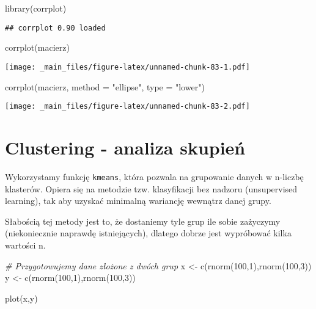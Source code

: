 \documentclass[
]{book}
\newenvironment{Shaded}{\begin{snugshade}}{\end{snugshade}}
\newcommand{\AttributeTok}[1]{\textcolor[rgb]{0.77,0.63,0.00}{#1}}
\newcommand{\CommentTok}[1]{\textcolor[rgb]{0.56,0.35,0.01}{\textit{#1}}}
\newcommand{\DecValTok}[1]{\textcolor[rgb]{0.00,0.00,0.81}{#1}}
\newcommand{\FunctionTok}[1]{\textcolor[rgb]{0.00,0.00,0.00}{#1}}
\newcommand{\NormalTok}[1]{#1}
\newcommand{\OtherTok}[1]{\textcolor[rgb]{0.56,0.35,0.01}{#1}}
\newcommand{\StringTok}[1]{\textcolor[rgb]{0.31,0.60,0.02}{#1}}
\begin{document}
\begin{Shaded}
\begin{Highlighting}[]
\FunctionTok{library}\NormalTok{(corrplot)}
\end{Highlighting}
\end{Shaded}

\begin{verbatim}
## corrplot 0.90 loaded
\end{verbatim}

\begin{Shaded}
\begin{Highlighting}[]
\FunctionTok{corrplot}\NormalTok{(macierz)}
\end{Highlighting}
\end{Shaded}

\texttt{[image: \_main\_files/figure-latex/unnamed-chunk-83-1.pdf]}

\begin{Shaded}
\begin{Highlighting}[]
\FunctionTok{corrplot}\NormalTok{(macierz, }\AttributeTok{method =} \StringTok{"ellipse"}\NormalTok{, }\AttributeTok{type =} \StringTok{"lower"}\NormalTok{)}
\end{Highlighting}
\end{Shaded}

\texttt{[image: \_main\_files/figure-latex/unnamed-chunk-83-2.pdf]}

\hypertarget{clustering---analiza-skupieux144}{%
\section{Clustering - analiza skupień}\label{clustering---analiza-skupieux144}}

Wykorzystamy funkcję \texttt{kmeans}, która pozwala na grupowanie danych w n-liczbę klasterów. Opiera się na metodzie tzw. klasyfikacji bez nadzoru (unsupervised learning), tak aby uzyskać minimalną wariancję wewnątrz danej grupy.

Słabością tej metody jest to, że dostaniemy tyle grup ile sobie zażyczymy (niekoniecznie naprawdę istniejących), dlatego dobrze jest wypróbować kilka wartości n.

\begin{Shaded}
\begin{Highlighting}[]
\CommentTok{\# Przygotowujemy dane złożone z dwóch grup}
\NormalTok{x }\OtherTok{\textless{}{-}} \FunctionTok{c}\NormalTok{(}\FunctionTok{rnorm}\NormalTok{(}\DecValTok{100}\NormalTok{,}\DecValTok{1}\NormalTok{),}\FunctionTok{rnorm}\NormalTok{(}\DecValTok{100}\NormalTok{,}\DecValTok{3}\NormalTok{))}
\NormalTok{y }\OtherTok{\textless{}{-}} \FunctionTok{c}\NormalTok{(}\FunctionTok{rnorm}\NormalTok{(}\DecValTok{100}\NormalTok{,}\DecValTok{1}\NormalTok{),}\FunctionTok{rnorm}\NormalTok{(}\DecValTok{100}\NormalTok{,}\DecValTok{3}\NormalTok{))}

\FunctionTok{plot}\NormalTok{(x,y)}
\end{Highlighting}
\end{Shaded}
\end{document}
